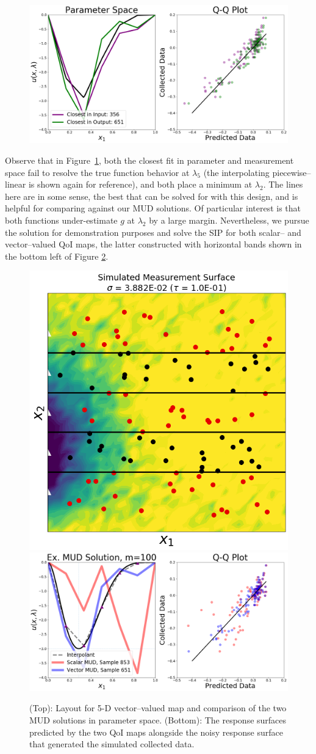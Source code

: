 
\begin{figure}[htbp]
\centering
  \includegraphics[width=0.675\linewidth]{figures/pde-highd/pde-highd_proj_D5}
\caption{
}
\label{fig:pde-5d-proj}
\end{figure}

Observe that in Figure~\ref{fig:pde-5d-proj}, both the closest fit in parameter and measurement space fail to resolve the true function behavior at $\lambda_5$ (the interpolating piecewise--linear is shown again for reference), and both place a minimum at $\lambda_2$.
The lines here are in some sense, the best that can be solved for with this design, and is helpful for comparing against our MUD solutions.
Of particular interest is that both functions under-estimate $g$ at $\lambda_2$ by a large margin.
Nevertheless, we pursue the solution for demonstration purposes and solve the SIP for both scalar-- and vector--valued QoI maps, the latter constructed with horizontal bands shown in the bottom left of Figure \ref{fig:pde-highd-5d-example}.

\begin{figure}[htbp]
\centering
  \includegraphics[width=0.35\linewidth]{figures/pde-highd/pde-highd_sensors_D5}
  \includegraphics[width=0.6\linewidth]{figures/pde-highd/pde-highd_comp_exmud_D5_m100}
\caption{
(Top): Layout for 5-D vector--valued map and comparison of the two MUD solutions in parameter space.
(Bottom): The response surfaces predicted by the two QoI maps alongside the noisy response surface that generated the simulated collected data.
}
\label{fig:pde-highd-5d-example}
\end{figure}

